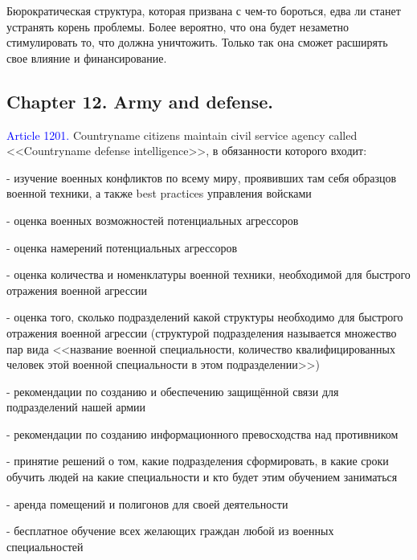 \documentclass[11pt]{article}
\theoremstyle{remark}
\theoremstyle{definition}
\begin{document}
\color{blue}

Бюрократическая структура, которая призвана с чем-то бороться, едва ли станет устранять корень проблемы. Более вероятно, что она будет незаметно стимулировать то, что должна уничтожить. Только так она сможет расширять свое влияние и финансирование.

\color{black}





\subsection*{Chapter 12. Army and defense.}










\textcolor{blue}{Article 1201.} Countryname citizens maintain civil service agency called <<Countryname defense intelligence>>, в обязанности которого входит:

- изучение военных конфликтов по всему миру, проявивших там себя образцов военной техники, а также best practices управления войсками

- оценка военных возможностей потенциальных агрессоров

- оценка намерений потенциальных агрессоров

- оценка количества и номенклатуры военной техники, необходимой для быстрого отражения военной агрессии

- оценка того, сколько подразделений какой структуры необходимо для быстрого отражения военной агрессии (структурой подразделения называется множество пар вида <<название военной специальности, количество квалифицированных человек этой военной специальности в этом подразделении>>) 

- рекомендации по созданию и обеспечению защищённой связи для подразделений нашей армии

- рекомендации по созданию информационного превосходства над противником

- принятие решений о том, какие подразделения сформировать, в какие сроки обучить людей на какие специальности и кто будет этим обучением заниматься

- аренда помещений и полигонов для своей деятельности

- бесплатное обучение всех желающих граждан любой из военных специальностей


\color{blue}
\end{document}
